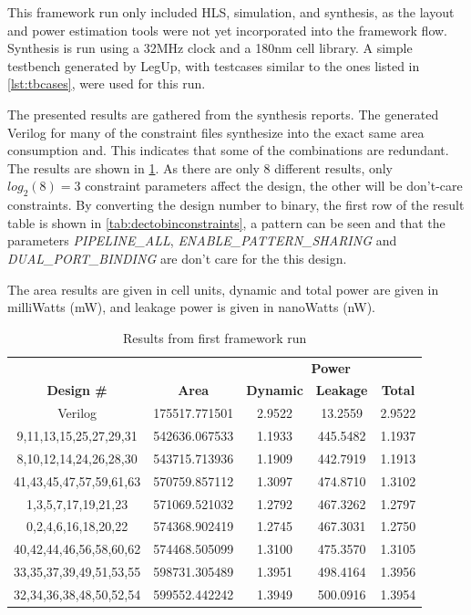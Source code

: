 This framework run only included HLS, simulation, and synthesis, as the layout and power estimation tools were not yet incorporated into the framework flow. Synthesis is run using a 32MHz clock and a 180nm cell library. A simple testbench generated by LegUp, with testcases similar to the ones listed in \cref{lst:tbcases}, were used for this run. 

The presented results are gathered from the synthesis reports. The generated Verilog for many of the constraint files synthesize into the exact same area consumption and. This indicates that some of the combinations are redundant. The results are shown in \cref{tab:hlsrun1dataresults}. As there are only 8 different results, only $log_2(8) = 3$ constraint parameters affect the design, the other will be don't-care constraints. By converting the design number to binary, the first row of the result table is shown in \cref{tab:dectobinconstraints}, a pattern can be seen and that the parameters \textit{PIPELINE\_ALL}, \textit{ENABLE\_PATTERN\_SHARING} and \textit{DUAL\_PORT\_BINDING} are don't care for the this design.

The area results are given in cell units, dynamic and total power are given in milliWatts (mW), and leakage power is given in nanoWatts (nW).


\begin{table}[hbtp]
    \centering
    \begin{tabular}{ccccc}
    & & \multicolumn{3}{c}{\textbf{Power}} \\
    \cline{3-5}
    \textbf{Design \#} & \textbf{Area} & \textbf{Dynamic} & \textbf{Leakage} & \textbf{Total} \\
    \toprule
    Verilog & 175517.771501 & 2.9522 & 13.2559 & 2.9522 \\
    9,11,13,15,25,27,29,31 & 542636.067533 & 1.1933 & 445.5482 & 1.1937 \\
    8,10,12,14,24,26,28,30 & 543715.713936 & 1.1909 & 442.7919 & 1.1913 \\
    41,43,45,47,57,59,61,63 & 570759.857112 & 1.3097 & 474.8710 & 1.3102 \\
    1,3,5,7,17,19,21,23 & 571069.521032 & 1.2792 & 467.3262 & 1.2797 \\
    0,2,4,6,16,18,20,22 & 574368.902419 & 1.2745 & 467.3031 & 1.2750 \\
    40,42,44,46,56,58,60,62 & 574468.505099 & 1.3100 & 475.3570 & 1.3105 \\
    33,35,37,39,49,51,53,55 & 598731.305489 & 1.3951 & 498.4164 & 1.3956 \\
    32,34,36,38,48,50,52,54 & 599552.442242 & 1.3949 & 500.0916 & 1.3954 \\
    \bottomrule
    \end{tabular}
    \caption{Results from first framework run}
    \label{tab:hlsrun1dataresults}
\end{table}

